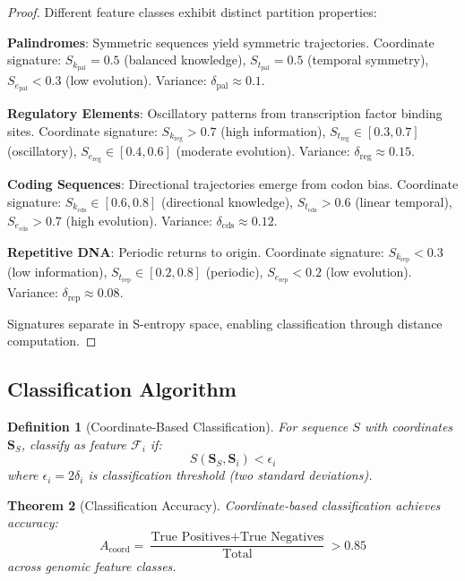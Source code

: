 \documentclass[11pt,a4paper]{article}
\newtheorem{theorem}{Theorem}[section]
\newtheorem{definition}[theorem]{Definition}
\theoremstyle{remark}
\newcommand{\Sk}{S_k}
\newcommand{\St}{S_t}
\newcommand{\Se}{S_e}
\newcommand{\Scoord}{\mathbf{S}}
\begin{document}
\begin{proof}
Different feature classes exhibit distinct partition properties:

\textbf{Palindromes}: Symmetric sequences yield symmetric trajectories. Coordinate signature: $\Sk_{\text{pal}} = 0.5$ (balanced knowledge), $\St_{\text{pal}} = 0.5$ (temporal symmetry), $\Se_{\text{pal}} < 0.3$ (low evolution). Variance: $\delta_{\text{pal}} \approx 0.1$.

\textbf{Regulatory Elements}: Oscillatory patterns from transcription factor binding sites. Coordinate signature: $\Sk_{\text{reg}} > 0.7$ (high information), $\St_{\text{reg}} \in [0.3, 0.7]$ (oscillatory), $\Se_{\text{reg}} \in [0.4, 0.6]$ (moderate evolution). Variance: $\delta_{\text{reg}} \approx 0.15$.

\textbf{Coding Sequences}: Directional trajectories emerge from codon bias. Coordinate signature: $\Sk_{\text{cds}} \in [0.6, 0.8]$ (directional knowledge), $\St_{\text{cds}} > 0.6$ (linear temporal), $\Se_{\text{cds}} > 0.7$ (high evolution). Variance: $\delta_{\text{cds}} \approx 0.12$.

\textbf{Repetitive DNA}: Periodic returns to origin. Coordinate signature: $\Sk_{\text{rep}} < 0.3$ (low information), $\St_{\text{rep}} \in [0.2, 0.8]$ (periodic), $\Se_{\text{rep}} < 0.2$ (low evolution). Variance: $\delta_{\text{rep}} \approx 0.08$.

Signatures separate in S-entropy space, enabling classification through distance computation.
\end{proof}

\subsection{Classification Algorithm}

\begin{definition}[Coordinate-Based Classification]
\label{def:coordinate_classification}
For sequence $S$ with coordinates $\Scoord_S$, classify as feature $\mathcal{F}_i$ if:
\begin{equation}
S(\Scoord_S, \Scoord_i) < \epsilon_i
\end{equation}
where $\epsilon_i = 2\delta_i$ is classification threshold (two standard deviations).
\end{definition}

\begin{theorem}[Classification Accuracy]
\label{thm:classification_accuracy}
Coordinate-based classification achieves accuracy:
\begin{equation}
A_{\text{coord}} = \frac{\text{True Positives} + \text{True Negatives}}{\text{Total}} > 0.85
\end{equation}
across genomic feature classes.
\end{theorem}
\end{document}
